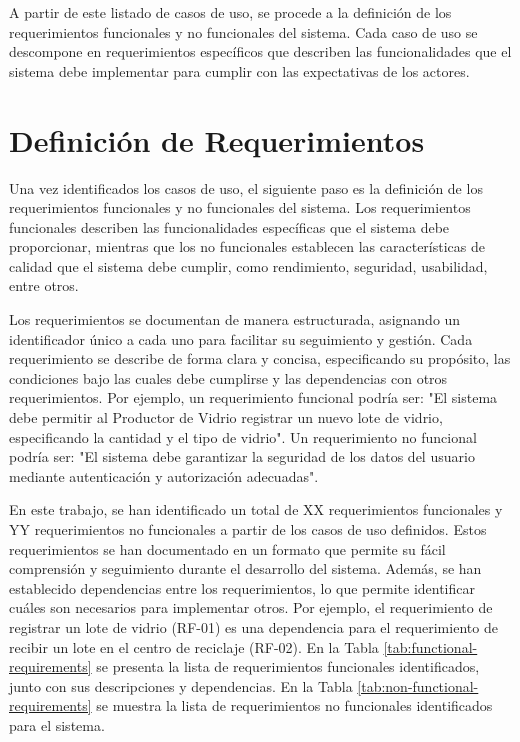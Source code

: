 A partir de este listado de casos de uso, se procede a la definición de los requerimientos funcionales y no funcionales del sistema. Cada caso de uso se descompone en requerimientos específicos que describen las funcionalidades que el sistema debe implementar para cumplir con las expectativas de los actores.

\section{Definición de Requerimientos}
\label{sec:requirements-definition}

Una vez identificados los casos de uso, el siguiente paso es la definición de los requerimientos funcionales y no funcionales del sistema. Los requerimientos funcionales describen las funcionalidades específicas que el sistema debe proporcionar, mientras que los no funcionales establecen las características de calidad que el sistema debe cumplir, como rendimiento, seguridad, usabilidad, entre otros.

Los requerimientos se documentan de manera estructurada, asignando un identificador único a cada uno para facilitar su seguimiento y gestión. Cada requerimiento se describe de forma clara y concisa, especificando su propósito, las condiciones bajo las cuales debe cumplirse y las dependencias con otros requerimientos. Por ejemplo, un requerimiento funcional podría ser: "El sistema debe permitir al Productor de Vidrio registrar un nuevo lote de vidrio, especificando la cantidad y el tipo de vidrio". Un requerimiento no funcional podría ser: "El sistema debe garantizar la seguridad de los datos del usuario mediante autenticación y autorización adecuadas".

En este trabajo, se han identificado un total de XX requerimientos funcionales y YY requerimientos no funcionales a partir de los casos de uso definidos. Estos requerimientos se han documentado en un formato que permite su fácil comprensión y seguimiento durante el desarrollo del sistema. Además, se han establecido dependencias entre los requerimientos, lo que permite identificar cuáles son necesarios para implementar otros. Por ejemplo, el requerimiento de registrar un lote de vidrio (RF-01) es una dependencia para el requerimiento de recibir un lote en el centro de reciclaje (RF-02). En la Tabla \ref{tab:functional-requirements} se presenta la lista de requerimientos funcionales identificados, junto con sus descripciones y dependencias. En la Tabla \ref{tab:non-functional-requirements} se muestra la lista de requerimientos no funcionales identificados para el sistema.

